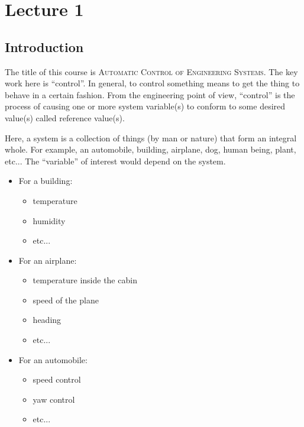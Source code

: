 \documentclass{book}
\begin{document}
\chapter*{Lecture 1}
\section*{Introduction}
The title of this course is \textsc{Automatic Control of Engineering Systems}. The key work here is ``control''. In general, to control something means to get the thing to behave in a certain fashion. From the engineering point of view, ``control'' is the process of causing one or more system variable(s) to conform to some desired value(s) called reference value(s).

Here, a system is a collection of things (by man or nature) that form an integral whole. For example, an automobile, building, airplane, dog, human being, plant, etc... The ``variable'' of interest would depend on the system.

\begin{itemize}
	\item For a building:
	\begin{itemize}
		\item temperature
		\item humidity
		\item etc...
	\end{itemize}
	\item For an airplane:
	\begin{itemize}
		\item temperature inside the cabin
		\item speed of the plane
		\item heading
		\item etc...
	\end{itemize}
	\item For an automobile:
	\begin{itemize}
		\item speed control
		\item yaw control
		\item etc...
	\end{itemize}
\end{itemize}
\end{document}
